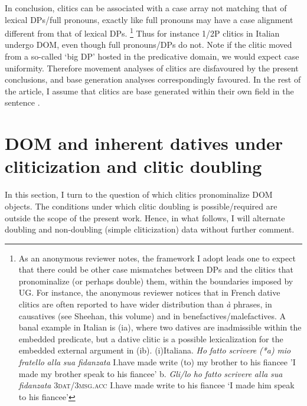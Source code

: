 \documentclass[output=paper]{langscibook}
\begin{document}
In conclusion, clitics can be associated with a case array not matching that of lexical DPs/full pronouns, exactly like full pronouns may have a case alignment different from that of lexical DPs.{} \footnote{As an anonymous reviewer notes, the framework I adopt leads one to expect that there could be other case mismatches between DPs and the clitics that pronominalize (or perhaps double) them, within the boundaries imposed by UG. For instance, the anonymous reviewer notices that in French dative clitics are often reported to have wider distribution than \textit{à} phrases, in causatives (see Sheehan, this volume) and in benefactives/malefactives. A banal example in Italian is (ia), where two datives are inadmissible within the embedded predicate, but a dative clitic is a possible lexicalization for the embedded external argument in (ib). \textrm{(i)Italian}\textrm{a.} \textrm{\textit{Ho} \textit{fatto} \textit{scrivere} \textit{(*a)} \textit{mio} \textit{fratello} \textit{alla} \textit{sua} \textit{fidanzata}} \textrm{I.have made write (to) my brother to his fiancee} \textrm{{}'I made my brother speak to his fiancee'} \textrm{b.} \textrm{\textit{Gli/lo}     \textit{ho} \textit{fatto} \textit{scrivere}   \textit{alla} \textit{sua} \textit{fidanzata}} \textrm{3}\textrm{\textsc{dat}}\textrm{/}\textrm{\textsc{3msg.acc} }\textrm{I.have made write   to his fiancee} \textrm{‘I made him speak to his fiancee’}} Thus for instance 1/2P clitics in Italian undergo DOM, even though full pronouns/DPs do not. Note if the clitic moved from a so-called ‘big DP’ hosted in the predicative domain, we would expect case uniformity. Therefore movement analyses of clitics are disfavoured by the present conclusions, and base generation analyses correspondingly favoured. In the rest of the article, I assume that clitics are base generated within their own field in the sentence \citep{Sportiche1996}.

\section{ DOM and inherent datives under cliticization and clitic doubling}  %

In this section, I turn to the question of which clitics pronominalize DOM objects. The conditions under which clitic doubling is possible/required are outside the scope of the present work. Hence, in what follows, I will alternate doubling and non-doubling (simple cliticization) data without further comment. 
\end{document}

